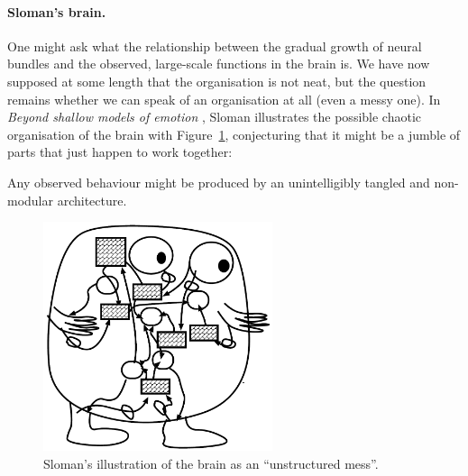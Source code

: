 \paragraph{Sloman's brain.} One might ask what the relationship between the gradual growth of neural bundles and the observed, large-scale functions in the brain is. We have now supposed at some length that the organisation is not neat, but the question remains whether we can speak of an organisation at all (even a messy one). In {\em Beyond shallow models of emotion} \cite[p.\ 8]{sloman2000}, Sloman illustrates the possible chaotic organisation of the brain with Figure~\ref{fig:slomanBrain}, conjecturing that it might be a jumble of parts that just happen to work together:

\begin{emquote}
	Any observed behaviour might be produced by an unintelligibly tangled and non-modular architecture. 
\end{emquote}

\begin{figure}
	\centering
	\includegraphics[width=0.6\textwidth]{Figs/slomanBrain.png}
	\caption{Sloman's illustration of the brain as an ``unstructured mess''.}
	\label{fig:slomanBrain}
\end{figure}

